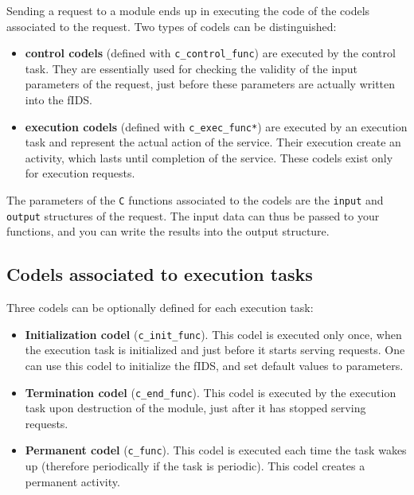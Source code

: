 Sending a request to a module ends up in executing the code of the codels
associated to the request. Two types of codels can be distinguished:

\begin{itemize}
\item {\bf control codels} (defined with {\tt c\_control\_func}) are
executed by the control task. They are essentially  used for checking the
validity    of the input parameters of    the  request, just before these
parameters are actually written into the fIDS.

\item {\bf execution codels} (defined with {\tt c\_exec\_func*}) are
executed by  an execution task  and  represent the actual  action of  the
service.    Their execution  create   an  activity,   which lasts   until
completion  of  the service.   These  codels  exist   only for  execution
requests.
\end{itemize}

The parameters of the {\tt C} functions associated to  the codels are the
{\tt  input} and {\tt output} structures  of  the request. The input data
can thus be passed to your functions, and you can  write the results into
the output structure.


\subsection{Codels associated to execution tasks}

Three codels can be optionally defined for each execution task:

\begin{itemize}
\item {\bf Initialization codel} ({\tt c\_init\_func}). This codel is
executed  only once, when  the  execution task   is initialized and  just
before it starts serving requests.  One can use  this codel to initialize
the fIDS, and set default values to parameters.

\item {\bf Termination codel} ({\tt c\_end\_func}). This codel is
executed by the execution task upon destruction of the module, just after
it has stopped serving requests.

\item {\bf Permanent codel} ({\tt c\_func}). This codel is executed
each  time  the task  wakes  up (therefore  periodically  if  the task is
periodic). This codel creates a permanent activity.
\end{itemize}


